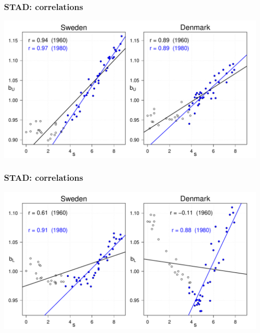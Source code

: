 \documentclass[12pt, xcolor=table]{beamer}  %
\begin{document}
\begin{frame}[noframenumbering]\frametitle{STAD: correlations}

\vspace{-0.5cm}
	

	\begin{center}	
		\vspace{0.2cm}
		
		\includegraphics[scale=.42]{Figures/Ch2/F_CORR_S}
		
	\end{center}
	
\end{frame}

\begin{frame}[noframenumbering]\frametitle{STAD: correlations}

\vspace{-0.5cm}
 
	
	\begin{center}	
		\vspace{0.2cm}
		
		\includegraphics[scale=.42]{Figures/Ch2/F_CORR_S-BL}
		
	\end{center}
	
\end{frame}
\end{document}
